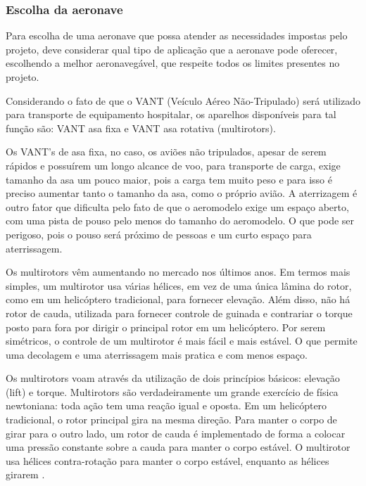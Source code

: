 \subsubsection{Escolha da aeronave}

Para escolha de uma aeronave que possa atender as necessidades impostas pelo projeto, deve considerar qual tipo de aplicação que a aeronave pode oferecer, escolhendo a melhor aeronavegável, que respeite todos os limites presentes no projeto. 

Considerando o fato de que o VANT (Veículo Aéreo Não-Tripulado) será utilizado para transporte de equipamento hospitalar, os aparelhos disponíveis para tal função são: VANT asa fixa e VANT asa rotativa (multirotors).

Os VANT’s de asa fixa, no caso, os aviões não tripulados, apesar de serem rápidos e possuírem um longo alcance de voo, para transporte de carga, exige tamanho da asa um pouco maior, pois a carga tem muito peso e para isso é preciso aumentar tanto o tamanho da asa, como o próprio avião. A aterrizagem é outro fator que dificulta pelo fato de que o aeromodelo exige um espaço aberto, com uma pista de pouso pelo menos do tamanho do aeromodelo. O que pode ser perigoso, pois o pouso será próximo de pessoas e um curto espaço para aterrissagem.

Os multirotors vêm aumentando no mercado nos últimos anos. Em termos mais simples, um multirotor usa várias hélices, em vez de uma única lâmina do rotor, como em um helicóptero tradicional, para fornecer elevação. Além disso, não há rotor de cauda, utilizada para fornecer controle de guinada e contrariar o torque posto para fora por dirigir o principal rotor em um helicóptero. Por serem simétricos, o controle de um multirotor é mais fácil e mais estável. O que permite uma decolagem e uma aterrissagem mais pratica e com menos espaço.
  
Os multirotors voam através da utilização de dois princípios básicos: elevação (lift) e torque.  Multirotors são verdadeiramente um grande exercício de física newtoniana: toda ação tem uma reação igual e oposta. Em um helicóptero tradicional, o rotor principal gira na mesma direção. Para manter o corpo de girar para o outro lado, um rotor de cauda é implementado de forma a colocar uma pressão constante sobre a cauda para manter o corpo estável. O multirotor usa hélices contra-rotação para manter o corpo estável, enquanto as hélices girarem \cite{audronis}.


